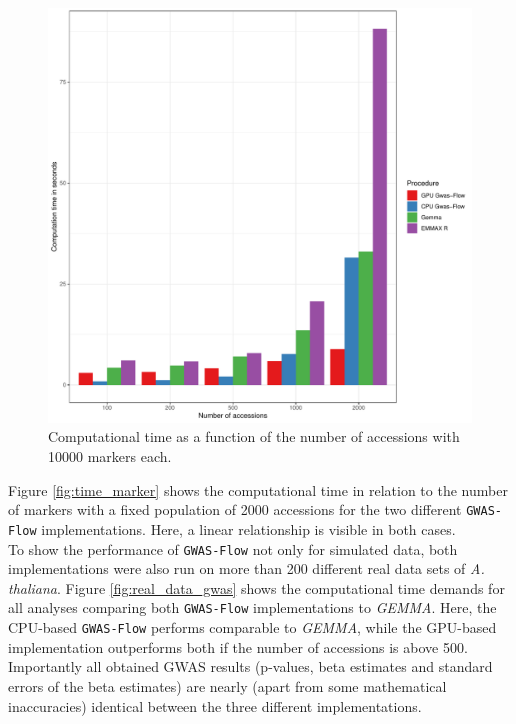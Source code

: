 \begin{figure}[H]
\centering
\includegraphics[height=.55\textheight, width=1.1\textwidth]{Figures/comp_time_gwas}
\decoRule
\caption[Computations time vs accessions]{Computational time as a function of the number
  of accessions with 10000 markers each.}
\label{fig:time_accessions}
\end{figure}

Figure \ref{fig:time_marker} shows the computational time in relation to the number of
markers with a fixed population of 2000 accessions for the two different
\texttt{GWAS-Flow} implementations. Here, a linear relationship is visible in both
cases.\\
To show the performance of \texttt{GWAS-Flow} not only for simulated data, both
implementations were also run on more than 200 different real data sets of
\textit{A. thaliana}. Figure \ref{fig:real_data_gwas} shows the computational time demands for all analyses
comparing both \texttt{GWAS-Flow} implementations to \textit{GEMMA}. Here, the CPU-based
\texttt{GWAS-Flow} performs comparable to \textit{GEMMA}, while the GPU-based
implementation outperforms both if the number of accessions is above 500. Importantly all
obtained GWAS results (p-values, beta estimates and standard errors of the beta estimates)
are nearly (apart from some mathematical inaccuracies) identical between the three
different implementations.

